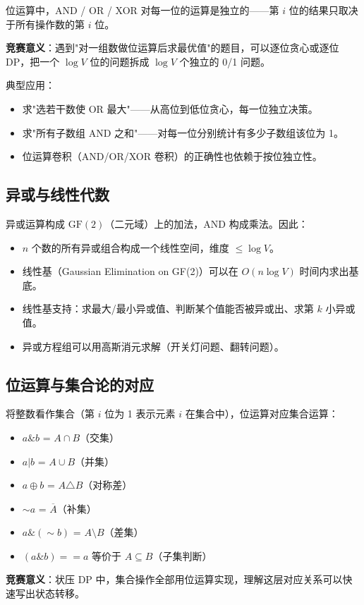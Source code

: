 \documentclass[UTF8,openany,oneside,zihao=-4]{ctexbook}
\begin{document}
\begin{note}
位运算中，AND / OR / XOR 对每一位的运算是独立的——第 $i$ 位的结果只取决于所有操作数的第 $i$ 位。

\textbf{竞赛意义}：遇到"对一组数做位运算后求最优值"的题目，可以逐位贪心或逐位 DP，把一个 $\log V$ 位的问题拆成 $\log V$ 个独立的 0/1 问题。

典型应用：
\begin{itemize}
  \item 求"选若干数使 OR 最大"——从高位到低位贪心，每一位独立决策。
  \item 求"所有子数组 AND 之和"——对每一位分别统计有多少子数组该位为 1。
  \item 位运算卷积（AND/OR/XOR 卷积）的正确性也依赖于按位独立性。
\end{itemize}
\end{note}

\subsection{异或与线性代数}

\begin{note}
异或运算构成 $\text{GF}(2)$（二元域）上的加法，AND 构成乘法。因此：
\begin{itemize}
  \item $n$ 个数的所有异或组合构成一个线性空间，维度 $\le \log V$。
  \item 线性基（Gaussian Elimination on GF(2)）可以在 $O(n \log V)$ 时间内求出基底。
  \item 线性基支持：求最大/最小异或值、判断某个值能否被异或出、求第 $k$ 小异或值。
  \item 异或方程组可以用高斯消元求解（开关灯问题、翻转问题）。
\end{itemize}
\end{note}

\subsection{位运算与集合论的对应}

\begin{note}
将整数看作集合（第 $i$ 位为 1 表示元素 $i$ 在集合中），位运算对应集合运算：
\begin{itemize}
  \item $a \& b$ = $A \cap B$（交集）
  \item $a | b$ = $A \cup B$（并集）
  \item $a \oplus b$ = $A \triangle B$（对称差）
  \item $\sim a$ = $\overline{A}$（补集）
  \item $a \& (\sim b)$ = $A \setminus B$（差集）
  \item $(a \& b) == a$ 等价于 $A \subseteq B$（子集判断）
\end{itemize}

\textbf{竞赛意义}：状压 DP 中，集合操作全部用位运算实现，理解这层对应关系可以快速写出状态转移。
\end{note}
\end{document}
